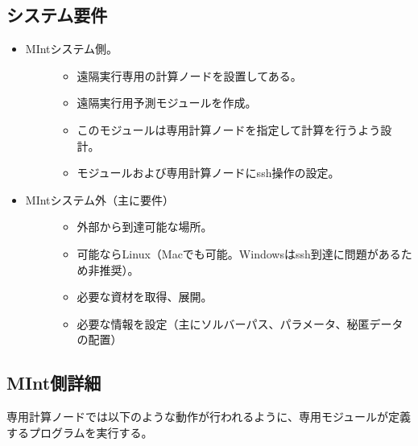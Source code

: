 \documentclass[letterpaper,10pt,dvipdfmx,openany]{sphinxmanual}
\begin{document}
\newpage


\subsection{システム要件}
\label{\detokenize{using_distributed_properties:id6}}\begin{itemize}
\item {} \begin{description}
\item[{MIntシステム側。}] \leavevmode\begin{itemize}
\item {} 
遠隔実行専用の計算ノードを設置してある。

\item {} 
遠隔実行用予測モジュールを作成。

\item {} 
このモジュールは専用計算ノードを指定して計算を行うよう設計。

\item {} 
モジュールおよび専用計算ノードにssh操作の設定。

\end{itemize}

\end{description}

\item {} \begin{description}
\item[{MIntシステム外（主に要件）}] \leavevmode\begin{itemize}
\item {} 
外部から到達可能な場所。

\item {} 
可能ならLinux（Macでも可能。Windowsはssh到達に問題があるため非推奨）。

\item {} 
必要な資材を取得、展開。

\item {} 
必要な情報を設定（主にソルバーパス、パラメータ、秘匿データの配置）

\end{itemize}

\end{description}

\end{itemize}


\subsection{MInt側詳細}
\label{\detokenize{using_distributed_properties:id7}}
専用計算ノードでは以下のような動作が行われるように、専用モジュールが定義するプログラムを実行する。
\end{document}
